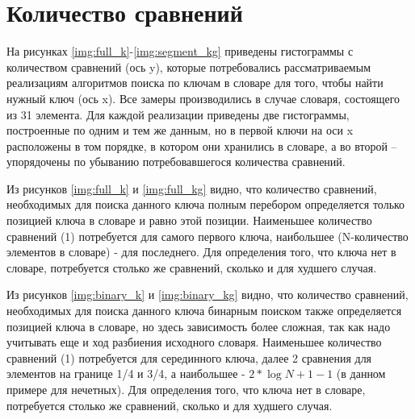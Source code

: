 

\section{Количество сравнений}

На рисунках \ref{img:full_k}-\ref{img:segment_kg} приведены гистограммы с количеством сравнений (ось y), которые потребовались рассматриваемым реализациям алгоритмов поиска по ключам в словаре для того, чтобы найти нужный ключ (ось x). Все замеры производились в случае словаря, состоящего из 31 элемента. Для каждой реализации приведены две гистограммы, построенные по одним и тем же данным, но в первой ключи на оси x расположены в том порядке, в котором они хранились в словаре, а во второй -- упорядочены по убыванию потребовавшегося количества сравнений.





Из рисунков \ref{img:full_k} и \ref{img:full_kg} видно, что количество сравнений, необходимых для поиска данного ключа полным перебором определяется только позицией ключа в словаре и равно этой позиции. Наименьшее количество сравнений (1) потребуется для самого первого ключа, наибольшее (N-количество элементов в словаре) - для последнего. Для определения того, что ключа нет в словаре, потребуется столько же сравнений, сколько и для худшего случая.

Из рисунков \ref{img:binary_k} и \ref{img:binary_kg} видно, что количество сравнений, необходимых для поиска данного ключа бинарным поиском также определяется позицией ключа в словаре, но здесь зависимость более сложная, так как надо учитывать еще и ход разбиения исходного словаря. Наименьшее количество сравнений (1) потребуется для серединного ключа, далее 2 сравнения для элементов на границе 1/4 и 3/4, а наибольшее - $2*\log{N+1} - 1$ (в данном примере для нечетных). Для определения того, что ключа нет в словаре, потребуется столько же сравнений, сколько и для худшего случая.

